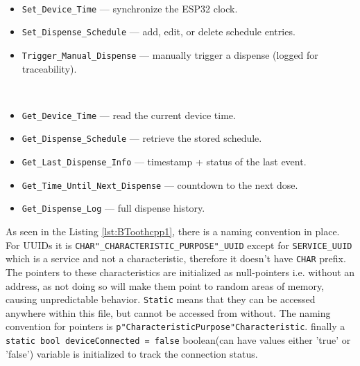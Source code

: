 \begin{description}[style=nextline] %
	\item[\textbf{Writable}]%
	\leavevmode\\[-0.8\baselineskip] %
	\begin{itemize}
		\item \texttt{Set\_Device\_Time} — synchronize the ESP32 clock.
		\item \texttt{Set\_Dispense\_Schedule} — add, edit, or delete schedule entries.
		\item \texttt{Trigger\_Manual\_Dispense} — manually trigger a dispense (logged for traceability).
	\end{itemize}
	
	\item[\textbf{Readable}]%
	\leavevmode\\[-0.8\baselineskip]
	\begin{itemize}
		\item \texttt{Get\_Device\_Time} — read the current device time.
		\item \texttt{Get\_Dispense\_Schedule} — retrieve the stored schedule.
		\item \texttt{Get\_Last\_Dispense\_Info} — timestamp + status of the last event.
		\item \texttt{Get\_Time\_Until\_Next\_Dispense} — countdown to the next dose.
		\item \texttt{Get\_Dispense\_Log} — full dispense history.
	\end{itemize}
\end{description}
As seen in the Listing \ref{lst:BToothcpp1}, there is a naming convention in place. For \ac{UUID}s it is \texttt{CHAR"\_CHARACTERISTIC\_PURPOSE"\_UUID} except for \texttt{SERVICE\_UUID} which is a service and not a characteristic, therefore it doesn't have \texttt{CHAR} prefix. The pointers to these characteristics are initialized as null-pointers i.e. without an address, as not doing so will make them point to random areas of memory, causing unpredictable behavior. \texttt{Static} means that they can be accessed anywhere within this file, but cannot be accessed from without. The naming convention for pointers is \texttt{p"CharacteristicPurpose"Characteristic}. finally a \texttt{static bool deviceConnected = false} boolean(can have values either 'true' or 'false') variable is initialized to track the connection status.
